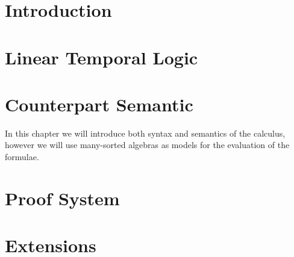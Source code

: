 \documentclass[a4paper,11pt]{report}
\begin{document}
\chapter{Introduction}


\chapter{Linear Temporal Logic}


\chapter{Counterpart Semantic}
In this chapter we will introduce both syntax and semantics of the calculus, however we will use many-sorted algebras as
models for the evaluation of the formulae.





\chapter{Proof System}


\chapter{Extensions}

\end{document}
